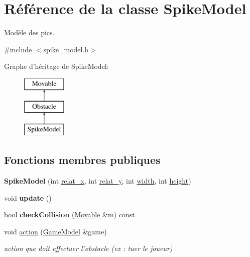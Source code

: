 \hypertarget{class_spike_model}{\section{Référence de la classe Spike\+Model}
\label{class_spike_model}
}


Modèle des pics.  




{\ttfamily \#include $<$spike\+\_\+model.\+h$>$}

Graphe d'héritage de Spike\+Model\+:\begin{figure}[H]
\begin{center}
\leavevmode
\includegraphics[height=3.000000cm]{class_spike_model}
\end{center}
\end{figure}
\subsection*{Fonctions membres publiques}
\begin{DoxyCompactItemize}
\item 
\hypertarget{class_spike_model_a605cb19e3a655723de00d377f0ea837c}{{\bfseries Spike\+Model} (int \hyperlink{class_obstacle_a37056563c8469b38aa240c7c423d7280}{relat\+\_\+x}, int \hyperlink{class_obstacle_a754f463db00e74fd5d66a758e4458c26}{relat\+\_\+y}, int \hyperlink{class_movable_a7e4607cccfcc96d2007c2e39c44cab54}{width}, int \hyperlink{class_movable_a192073065bc62d054f259c3b1522c09e}{height})}\label{class_spike_model_a605cb19e3a655723de00d377f0ea837c}

\item 
\hypertarget{class_spike_model_a7d67f499d61be79ac7e4d7dda6182fdc}{void {\bfseries update} ()}\label{class_spike_model_a7d67f499d61be79ac7e4d7dda6182fdc}

\item 
\hypertarget{class_spike_model_a927200210e1c51c5577dd950e21a01d5}{bool {\bfseries check\+Collision} (\hyperlink{class_movable}{Movable} \&m) const }\label{class_spike_model_a927200210e1c51c5577dd950e21a01d5}

\item 
\hypertarget{class_spike_model_a8a683255fb791a0f9d9113c8eb873df4}{void \hyperlink{class_spike_model_a8a683255fb791a0f9d9113c8eb873df4}{action} (\hyperlink{class_game_model}{Game\+Model} \&game)}\label{class_spike_model_a8a683255fb791a0f9d9113c8eb873df4}

\begin{DoxyCompactList}\small\item\em action que doit effectuer l'obstacle (ex \+: tuer le joueur) \end{DoxyCompactList}\end{DoxyCompactItemize}

